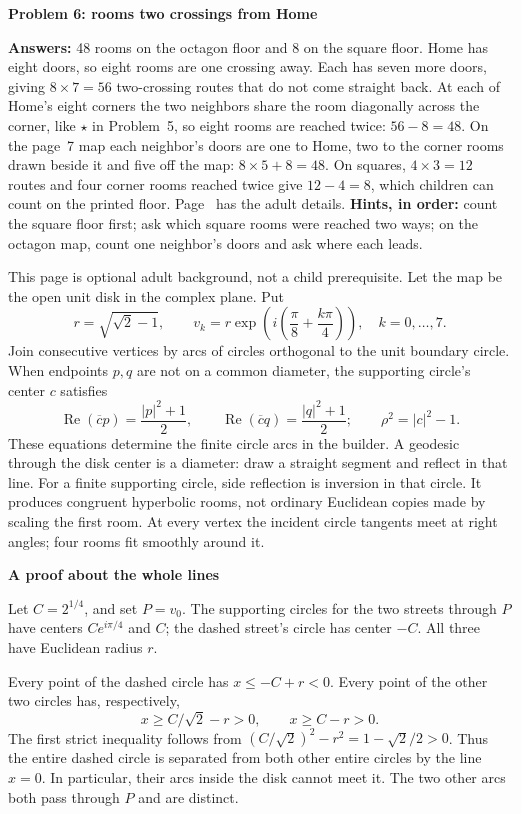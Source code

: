 \documentclass[11pt]{article}
\newcommand{\topic}[1]{\vspace{4pt}{\large\bfseries #1}\par}
\newcommand{\sub}[1]{{\bfseries #1}\par}
\begin{document}
\sub{Problem 6: rooms two crossings from Home}
\textbf{Answers:} 48 rooms on the octagon floor and 8 on the square floor. Home has eight doors, so eight rooms are one crossing away. Each has seven more doors, giving \(8\times7=56\) two-crossing routes that do not come straight back. At each of Home's eight corners the two neighbors share the room diagonally across the corner, like \(\star\) in Problem~5, so eight rooms are reached twice: \(56-8=48\). On the page~7 map each neighbor's doors are one to Home, two to the corner rooms drawn beside it and five off the map: \(8\times5+8=48\). On squares, \(4\times3=12\) routes and four corner rooms reached twice give \(12-4=8\), which children can count on the printed floor. Page~\pageref{growth} has the adult details. \textbf{Hints, in order:} count the square floor first; ask which square rooms were reached two ways; on the octagon map, count one neighbor's doors and ask where each leads.
\newpage

\topic{Why the model and complete-road claim are sound}\label{complete-proof}
This page is optional adult background, not a child prerequisite. Let the map be the open unit disk in the complex plane. Put
\[
 r=\sqrt{\sqrt2-1},\qquad
 v_k=r\exp\!\left(i\left(\frac{\pi}{8}+\frac{k\pi}{4}\right)\right),\quad k=0,\ldots,7.
\]
Join consecutive vertices by arcs of circles orthogonal to the unit boundary circle. When endpoints \(p,q\) are not on a common diameter, the supporting circle's center \(c\) satisfies
\[
 \operatorname{Re}(\overline c p)=\frac{|p|^2+1}{2},\qquad
 \operatorname{Re}(\overline c q)=\frac{|q|^2+1}{2};
 \qquad \rho^2=|c|^2-1.
\]
These equations determine the finite circle arcs in the builder. A geodesic through the disk center is a diameter: draw a straight segment and reflect in that line. For a finite supporting circle, side reflection is inversion in that circle. It produces congruent hyperbolic rooms, not ordinary Euclidean copies made by scaling the first room. At every vertex the incident circle tangents meet at right angles; four rooms fit smoothly around it.

\sub{A proof about the whole lines}
Let \(C=2^{1/4}\), and set \(P=v_0\). The supporting circles for the two streets through \(P\) have centers \(C e^{i\pi/4}\) and \(C\); the dashed street's circle has center \(-C\). All three have Euclidean radius \(r\).

Every point of the dashed circle has \(x\le -C+r<0\). Every point of the other two circles has, respectively,
\[
 x\ge C/\sqrt2-r>0,\qquad x\ge C-r>0.
\]
The first strict inequality follows from
\((C/\sqrt2)^2-r^2=1-\sqrt2/2>0\). Thus the entire dashed circle is separated from both other entire circles by the line \(x=0\). In particular, their arcs inside the disk cannot meet it. The two other arcs both pass through \(P\) and are distinct.
\end{document}
